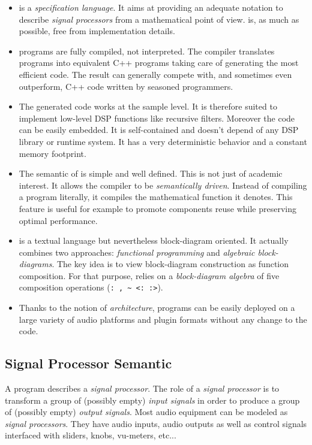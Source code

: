 \begin{itemize}

\item \faust is a \textit{specification language}. It aims at providing an adequate notation to describe \textit{signal processors} from a mathematical point of view. \faust is, as much as possible, free from implementation details. 

\item \faust programs are fully compiled, not interpreted. The compiler translates \faust programs into equivalent C++ programs taking care of generating the most efficient code. The result can generally compete with, and sometimes even outperform, C++ code written by seasoned programmers. 

\item The generated code works at the sample level. It is therefore suited to implement low-level DSP functions like recursive filters. Moreover the code can be easily embedded. It is self-contained and doesn't depend of any DSP library or runtime system. It has a very deterministic behavior and a constant memory footprint. 

\item The semantic of \faust is simple and well defined. This is not just of academic interest. It allows the \faust compiler to be \emph{semantically driven}. Instead of compiling a program literally, it compiles the mathematical function it denotes. This feature is useful for example to promote components reuse while preserving optimal performance.  

\item \faust is a textual language but nevertheless block-diagram oriented. It actually combines two approaches: \textit{functional programming} and \textit{algebraic block-diagrams}. The key idea is to view block-diagram construction as function composition. For that purpose, \faust relies on a \emph{block-diagram algebra} of five composition operations (\lstinline': , ~ <: :>').

\item Thanks to the notion of \textit{architecture}, \faust programs can be easily deployed on a large variety of audio platforms and plugin formats without any change to the \faust code.

\end{itemize}

\subsection{Signal Processor Semantic}
A \faust program describes a \emph{signal processor}. 
The role of a \textit{signal processor} is to transform a group  of (possibly empty) \emph{input signals} in order to produce a group of (possibly empty) \emph{output signals}. 
Most audio equipment can be modeled as \emph{signal processors}. 
They have audio inputs, audio outputs as well as control signals interfaced with sliders, knobs, vu-meters, etc... \\

